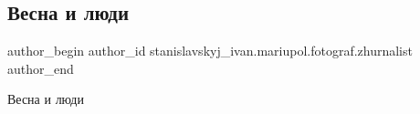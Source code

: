  
 
 
 
 

\subsection{Весна и люди}
\label{sec:23_04_2019.fb.stanislavskyj_ivan.mariupol.fotograf.zhurnalist.1.vesna_i_ludi}

\ifcmt
 author_begin
   author_id stanislavskyj_ivan.mariupol.fotograf.zhurnalist
 author_end
\fi

Весна и люди
